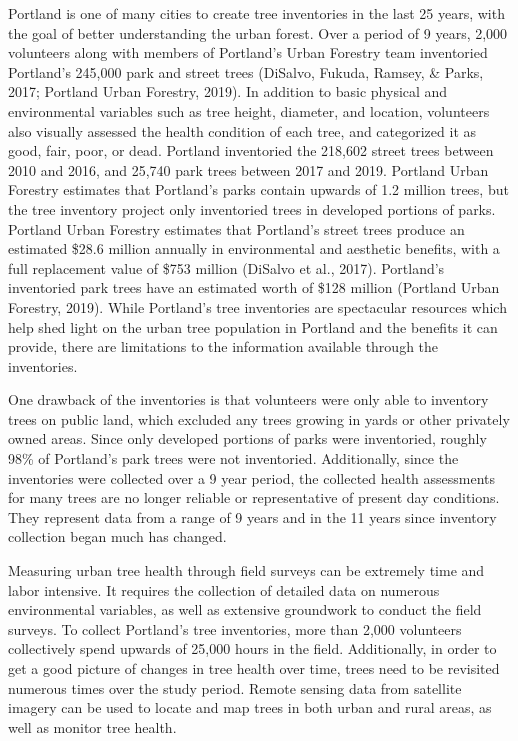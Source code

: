 \documentclass[12pt,twoside]{reedthesis}
\begin{document}
Portland is one of many cities to create tree inventories in the last 25 years, with the goal of better understanding the urban forest. Over a period of 9 years, 2,000 volunteers along with members of Portland's Urban Forestry team inventoried Portland's 245,000 park and street trees (DiSalvo, Fukuda, Ramsey, \& Parks, 2017; Portland Urban Forestry, 2019). In addition to basic physical and environmental variables such as tree height, diameter, and location, volunteers also visually assessed the health condition of each tree, and categorized it as good, fair, poor, or dead. Portland inventoried the 218,602 street trees between 2010 and 2016, and 25,740 park trees between 2017 and 2019. Portland Urban Forestry estimates that Portland's parks contain upwards of 1.2 million trees, but the tree inventory project only inventoried trees in developed portions of parks. Portland Urban Forestry estimates that Portland's street trees produce an estimated \$28.6 million annually in environmental and aesthetic benefits, with a full replacement value of \$753 million (DiSalvo et al., 2017). Portland's inventoried park trees have an estimated worth of \$128 million (Portland Urban Forestry, 2019). While Portland's tree inventories are spectacular resources which help shed light on the urban tree population in Portland and the benefits it can provide, there are limitations to the information available through the inventories.

One drawback of the inventories is that volunteers were only able to inventory trees on public land, which excluded any trees growing in yards or other privately owned areas. Since only developed portions of parks were inventoried, roughly 98\% of Portland's park trees were not inventoried. Additionally, since the inventories were collected over a 9 year period, the collected health assessments for many trees are no longer reliable or representative of present day conditions. They represent data from a range of 9 years and in the 11 years since inventory collection began much has changed.

Measuring urban tree health through field surveys can be extremely time and labor intensive. It requires the collection of detailed data on numerous environmental variables, as well as extensive groundwork to conduct the field surveys. To collect Portland's tree inventories, more than 2,000 volunteers collectively spend upwards of 25,000 hours in the field. Additionally, in order to get a good picture of changes in tree health over time, trees need to be revisited numerous times over the study period. Remote sensing data from satellite imagery can be used to locate and map trees in both urban and rural areas, as well as monitor tree health.
\end{document}
